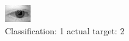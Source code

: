 \begin{figure}[h!]
\begin{center}
\includegraphics[width=0.60\columnwidth]{figures/ID487_class_1_target_2.png}
\end{center}
\caption{ Classification: 1 actual target: 2}
\label{fig:ID487_class_1_target_2}
\end{figure}
